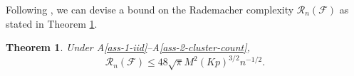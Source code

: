 \documentclass[12pt]{article}
\newtheorem{thm}{Theorem}[section]
\newtheorem{lemma}{Lemma}[section]
\newtheorem{defn}{Definition}
\begin{document}

Following \cite{paul2021uniform}, we can devise a bound on the Rademacher complexity $\mathcal{R}_n(\mathcal{F})$ as stated in Theorem \ref{thm-1-RnF}.

\begin{thm}\label{thm-1-RnF}
    Under A\ref{ass-1-iid}--A\ref{ass-2-cluster-count}, 
    \begin{equation*}
        \mathcal{R}_n(\mathcal{F})\le 48\sqrt{\pi}M^2(Kp)^{3/2}n^{-1/2}.
    \end{equation*}
\end{thm}
\end{document}
